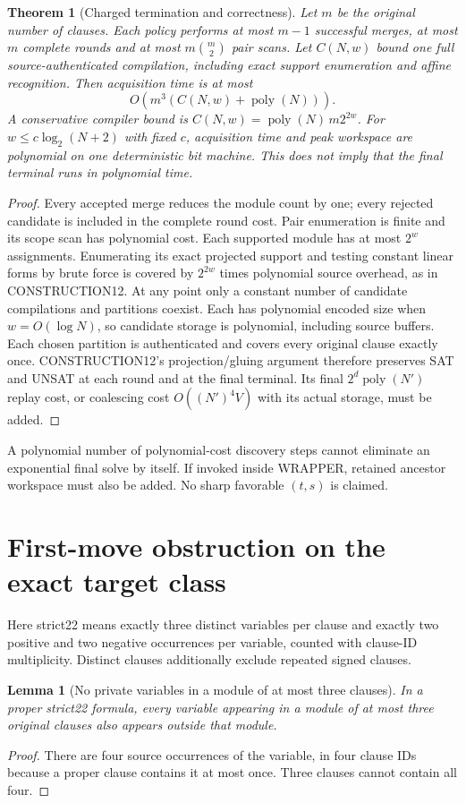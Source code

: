 \documentclass[11pt]{article}
\newtheorem{theorem}{Theorem}
\newtheorem{lemma}{Lemma}
\begin{document}
\begin{theorem}[Charged termination and correctness]
Let $m$ be the original number of clauses. Each policy performs at most
$m-1$ successful merges, at most $m$ complete rounds and at most
$m\binom m2$ pair scans. Let $C(N,w)$ bound one full source-authenticated
compilation, including exact support enumeration and affine recognition.
Then acquisition time is at most
\[
 O(m^3(C(N,w)+\operatorname{poly}(N))).
\]
A conservative compiler bound is
$C(N,w)=\operatorname{poly}(N)\,m2^{2w}$.
For $w\le c\log_2(N+2)$ with fixed $c$, acquisition time and peak workspace
are polynomial on one deterministic bit machine. This does not imply
that the final terminal runs in polynomial time.
\end{theorem}
\begin{proof}
Every accepted merge reduces the module count by one; every rejected
candidate is included in the complete round cost. Pair enumeration is
finite and its scope scan has polynomial cost. Each supported module
has at most $2^w$ assignments. Enumerating its exact projected support and
testing constant linear forms by brute force is covered by $2^{2w}$
times polynomial source overhead, as in CONSTRUCTION12.
At any point only a constant number of candidate compilations and
partitions coexist. Each has polynomial encoded size when $w=O(\log N)$,
so candidate storage is polynomial, including source buffers.
Each chosen partition is authenticated and covers every original clause
exactly once. CONSTRUCTION12's projection/gluing argument therefore
preserves SAT and UNSAT at each round and at the final terminal.
Its final $2^d\operatorname{poly}(N')$ replay cost, or coalescing cost
$O((N')^4V)$ with its actual storage, must be added.
\end{proof}
A polynomial number of polynomial-cost discovery steps cannot eliminate
an exponential final solve by itself. If invoked inside WRAPPER, retained
ancestor workspace must also be added. No sharp favorable $(t,s)$ is claimed.

\section{First-move obstruction on the exact target class}
Here strict22 means exactly three distinct variables per clause and exactly
two positive and two negative occurrences per variable, counted with clause-ID
multiplicity. Distinct clauses additionally exclude repeated signed clauses.

\begin{lemma}[No private variables in a module of at most three clauses]
In a proper strict22 formula, every variable appearing in a module of at most
three original clauses also appears outside that module.
\end{lemma}
\begin{proof}
There are four source occurrences of the variable, in four clause IDs because
a proper clause contains it at most once. Three clauses cannot contain all four.
\end{proof}
\end{document}
